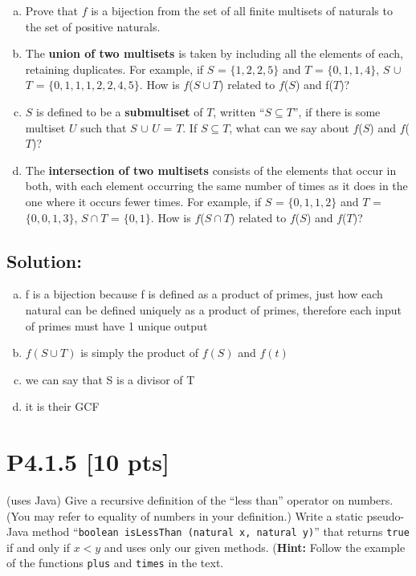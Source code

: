 \documentclass[12pt]{article}
\begin{document}
\begin{enumerate}[(a)]
    \item Prove that $f$ is a bijection from the set of all finite multisets of naturals to the set of positive naturals.

    \item  The \textbf{union of two multisets} is taken by including all the elements of each, retaining duplicates. For example, if $S$ = $\{1, 2, 2, 5\}$ and $T$ = $\{0, 1, 1, 4\}$, $S$ $\cup$ $T$ = $\{0, 1, 1, 1, 2, 2, 4, 5\}$. How is $f$($S \cup T$) related to $f$($S$) and f($T$)?

    \item$ S$ is defined to be a \textbf{submultiset} of $T$, written “$S \subseteq T$”, if there is some multiset $U$ such that $S$ $\cup$ $U$ = $T$. If $S \subseteq T$, what can we say about $f$($S$) and $f$($T$)?

    \item  The \textbf{intersection of two multisets} consists of the elements that occur in both, with each element occurring the same number of times as it does in the one where it occurs fewer times. For example, if $S$ = $\{0, 1, 1, 2\}$ and $T$ = $\{0, 0, 1, 3\}$, $S \cap T$ = $\{0, 1\}$. How is $f$($S \cap T$) related to $f$($S$) and $f$($T$)?
    
\end{enumerate}


\subsection*{\textbf{Solution:}}
\begin{enumerate}[(a)]
    \item f is a bijection because f is defined as a product of primes, just how each natural can be defined uniquely as a product of primes, therefore each input of primes must have 1 unique output

    \item $f (S\cup T)$ is simply the product of $f(S)$ and $f(t)$

    \item we can say that S is a divisor of T

    \item it is their GCF
    
\end{enumerate}

\newpage
\section*{\textbf{P4.1.5} [10 pts]}
 (uses Java) Give a recursive definition of the “less than” operator on numbers. (You may refer to equality of numbers in your definition.) Write a static pseudo-Java method “\texttt{boolean isLessThan (natural x, natural y)}” that returns \texttt{true} if and only if $x < y$ and uses only our given methods. (\textbf{Hint:} Follow the example of the functions \texttt{plus} and \texttt{times} in the text.
\end{document}
